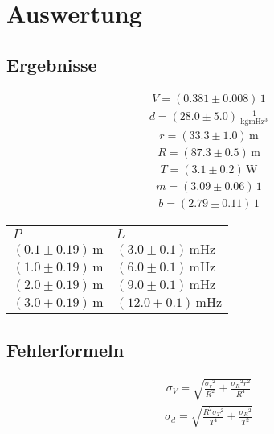 \documentclass[a4paper,10pt]{scrbook}
\begin{document}
\section*{Auswertung}

\subsection*{Ergebnisse}

\begin{align*}
V = (0.381\pm 0.008)\,\mathrm{1}
\end{align*}
\begin{align*}
d = (28.0\pm 5.0)\,\mathrm{\frac{1}{kg m Hz^{3}}}
\end{align*}
\begin{align*}
r = (33.3\pm 1.0)\,\mathrm{m}
\end{align*}
\begin{align*}
R = (87.3\pm 0.5)\,\mathrm{m}
\end{align*}
\begin{align*}
T = (3.1\pm 0.2)\,\mathrm{W}
\end{align*}
\begin{align*}
m = (3.09\pm 0.06)\,\mathrm{1}
\end{align*}
\begin{align*}
b = (2.79\pm 0.11)\,\mathrm{1}
\end{align*}
\begin{table}[htb]
\centering
\begin{tabular}{|l|l|}
\hline
$P$ & $L$  \\ \hline
$(0.1\pm 0.19)\,\mathrm{m}$ & $(3.0\pm 0.1)\,\mathrm{m Hz}$\\ \hline
$(1.0\pm 0.19)\,\mathrm{m}$ & $(6.0\pm 0.1)\,\mathrm{m Hz}$\\ \hline
$(2.0\pm 0.19)\,\mathrm{m}$ & $(9.0\pm 0.1)\,\mathrm{m Hz}$\\ \hline
$(3.0\pm 0.19)\,\mathrm{m}$ & $(12.0\pm 0.1)\,\mathrm{m Hz}$\\ \hline
\end{tabular}
\end{table}


\subsection*{Fehlerformeln}

\begin{align*}\sigma_{V}=\sqrt{\frac{{\sigma_{{r}}}^{2}}{{R}^{2}} + \frac{{\sigma_{{R}}}^{2} {r}^{2}}{{R}^{4}}}\end{align*}\begin{align*}\sigma_{d}=\sqrt{\frac{{R}^{2} {\sigma_{{T}}}^{2}}{{T}^{4}} + \frac{{\sigma_{{R}}}^{2}}{{T}^{2}}}\end{align*}
\end{document}
